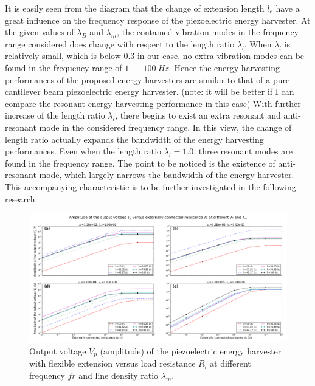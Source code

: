 \documentclass{elsarticle}
\begin{document}
It is easily seen from the diagram that the change of extension length $l_e$ have a great influence on the frequency response of the piezoelectric energy harvester. At the given values of $\lambda_B$ and $\lambda_m$, the contained vibration modes in the frequency range considered does change with respect to
the length ratio $\lambda_l$. When $\lambda_l$ is relatively small, which is below $0.3$ in our case, no extra vibration modes can be found in the frequency range of $1\ - \ 100\ Hz$. Hence the energy harvesting performances of the proposed energy harvesters are similar to that of a pure cantilever beam piezoelectric energy harvester. (note: it will be better if I can compare the resonant energy harvesting performance in this case) With further increase of the length ratio $\lambda_l$, there begins to exist an extra resonant and anti-resonant mode in the considered frequency range. In this view, the change of length ratio actually expands the bandwidth of the energy harvesting performances. Even when the length ratio $\lambda_l = 1.0$, three resonant modes are found in the frequency range. The point to be noticed is the existence of anti-resonant mode, which largely narrows the bandwidth of the energy harvester. This accompanying characteristic is to be further investigated in the following research. 


\begin{figure}[!htbp]
    \centering
    \includegraphics[width=\textwidth]{./fig_vol_lamm_list_vs_fr_Rl}
    \caption{Output voltage $V_p$ (amplitude) of the piezoelectric energy harvester with flexible extension versus load resistance $R_l$ at different frequency $fr$ and line density ratio $\lambda_m$. }
    \label{fig:fig_vol_lamm_list_vs_fr_Rl}
\end{figure}
\end{document}
